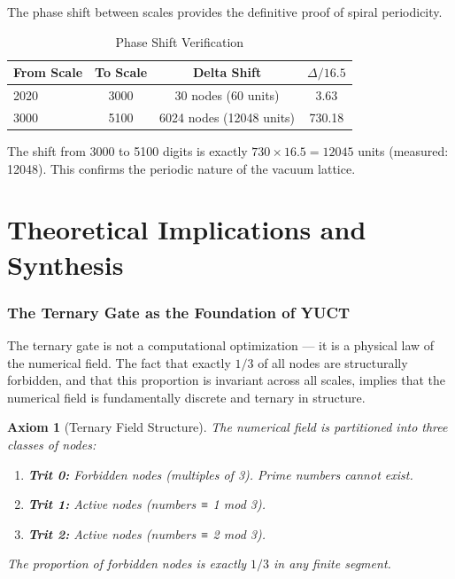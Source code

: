 \documentclass[12pt,a4paper]{article}
\newtheorem{axiom}{Axiom}[section]
\begin{document}
	The phase shift between scales provides the definitive proof of spiral periodicity.
	
	\begin{table}[H]
		\centering
		\caption{Phase Shift Verification}
		\label{tab:phase-shift}
		\begin{tabular}{l c c c}
			\toprule
			\textbf{From Scale} & \textbf{To Scale} & \textbf{Delta Shift} & \(\Delta / 16.5\) \\
			\midrule
			2020 & 3000 & 30 nodes (60 units) & 3.63 \\
			3000 & 5100 & 6024 nodes (12048 units) & 730.18 \\
			\bottomrule
		\end{tabular}
	\end{table}
	
	\begin{verifiedbox}
		The shift from 3000 to 5100 digits is exactly \(730 \times 16.5 = 12045\) units (measured: 12048). This confirms the periodic nature of the vacuum lattice.
	\end{verifiedbox}
	
	\newpage
	
	\part{Theoretical Implications and Synthesis}
	
	\section{The Ternary Gate as the Foundation of YUCT}
	
	The ternary gate is not a computational optimization — it is a physical law of the numerical field. The fact that exactly \(1/3\) of all nodes are structurally forbidden, and that this proportion is invariant across all scales, implies that the numerical field is fundamentally discrete and ternary in structure.
	
	\begin{axiom}[Ternary Field Structure]
		The numerical field is partitioned into three classes of nodes:
		\begin{enumerate}
			\item \textbf{Trit 0:} Forbidden nodes (multiples of 3). Prime numbers cannot exist.
			\item \textbf{Trit 1:} Active nodes (numbers ≡ 1 mod 3).
			\item \textbf{Trit 2:} Active nodes (numbers ≡ 2 mod 3).
		\end{enumerate}
		The proportion of forbidden nodes is exactly \(1/3\) in any finite segment.
	\end{axiom}
	
\end{document}
